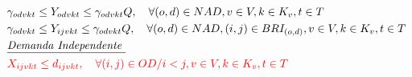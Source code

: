 \begin{align}
	 & \gamma_{odvkt} \leq Y_{odvkt} \leq \gamma_{odvkt} Q, \quad  \forall (o,d)\in NAD, v \in V, k \in K_v, t \in T                                                                                                       \label{eq: m1_activ_bin_autho}                                                 \\
	 & \gamma_{odvkt} \leq Y_{ijvkt} \leq \gamma_{odvkt} Q, \quad  \forall (o,d)\in NAD, (i,j) \in BRI_{(o,d)}, v \in V, k \in K_v, t \in T                                                                                \label{eq: m1_autho_igualar_trecho_maior}                                      \\
	 & \textit{\underline{Demanda Independente  }}         \notag                                                                                                                                                                                                                                 \\
	 & \textcolor{red}{X_{ijvkt} \leq d_{ijvkt},  \quad \forall (i,j) \in OD / i < j  ,v \in V, k \in K_v, t\in T }                                                                                                 \label{eq: m1_assig_menor_dem}                                                 \\

\end{align}
